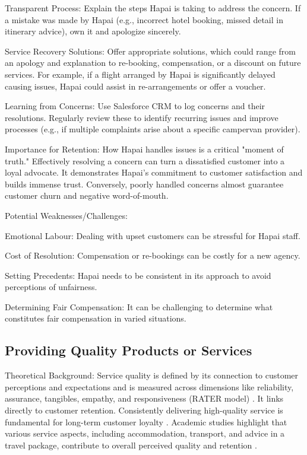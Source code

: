 \documentclass{article}
\begin{document}
Transparent Process: Explain the steps Hapai is taking to address the concern. If a mistake was made by Hapai (e.g., incorrect hotel booking, missed detail in itinerary advice), own it and apologize sincerely.

Service Recovery Solutions: Offer appropriate solutions, which could range from an apology and explanation to re-booking, compensation, or a discount on future services. For example, if a flight arranged by Hapai is significantly delayed causing issues, Hapai could assist in re-arrangements or offer a voucher.

Learning from Concerns: Use Salesforce CRM to log concerns and their resolutions. Regularly review these to identify recurring issues and improve processes (e.g., if multiple complaints arise about a specific campervan provider).

Importance for Retention:
How Hapai handles issues is a critical "moment of truth." Effectively resolving a concern can turn a dissatisfied customer into a loyal advocate. It demonstrates Hapai's commitment to customer satisfaction and builds immense trust. Conversely, poorly handled concerns almost guarantee customer churn and negative word-of-mouth.

Potential Weaknesses/Challenges:

Emotional Labour: Dealing with upset customers can be stressful for Hapai staff.

Cost of Resolution: Compensation or re-bookings can be costly for a new agency.

Setting Precedents: Hapai needs to be consistent in its approach to avoid perceptions of unfairness.

Determining Fair Compensation: It can be challenging to determine what constitutes fair compensation in varied situations.

\subsection{Providing Quality Products or Services}

Theoretical Background:
Service quality is defined by its connection to customer perceptions and expectations and is measured across dimensions like reliability, assurance, tangibles, empathy, and responsiveness (RATER model) \cite{barusman_customer_2020}. It links directly to customer retention. Consistently delivering high-quality service is fundamental for long-term customer loyalty \cite{petzer_customer_2009}. Academic studies highlight that various service aspects, including accommodation, transport, and advice in a travel package, contribute to overall perceived quality and retention \cite{liljestam_predicting_nodate,viljoen_customer_2016}.
\end{document}
